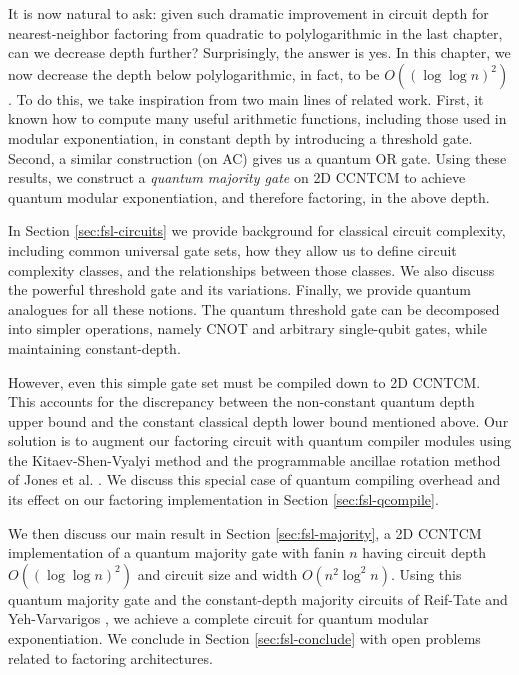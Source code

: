 It is now natural to ask: given such dramatic improvement in circuit depth
for nearest-neighbor factoring
from quadratic \cite{Kutin2006} to polylogarithmic in the last chapter, can we
decrease depth further? Surprisingly, the answer is yes. In this
chapter, we now decrease the depth below polylogarithmic, in fact,
to be $O((\log \log n)^2)$. To do this, we take inspiration from
two main lines of related work. First, it known how to compute
many useful arithmetic functions, including those used in modular
exponentiation, in constant depth by introducing a threshold gate.
Second, a similar construction (on \textsf{AC}) gives us a
quantum OR gate. Using these results,
we construct a \emph{quantum majority gate} on \textsf{2D CCNTCM} to
achieve quantum modular exponentiation, and therefore factoring, in the above
depth.

In Section \ref{sec:fsl-circuits} we provide background for classical circuit complexity,
including common universal gate sets, how they allow us to define circuit
complexity classes, and the relationships between those classes. We also
discuss the powerful threshold gate and its variations. Finally, we provide
quantum analogues for all these notions.
The quantum threshold
gate can be decomposed into simpler operations, namely CNOT and
arbitrary single-qubit gates, while maintaining constant-depth.

However,
even this simple gate set must be compiled down to \textsf{2D CCNTCM}.
This accounts for the discrepancy between the
non-constant quantum depth upper bound and the constant classical
depth lower bound mentioned above. Our solution is to augment our factoring circuit
with quantum compiler modules using the Kitaev-Shen-Vyalyi method \cite{Kitaev2002}
and the programmable ancillae rotation method of Jones et al. \cite{Jones2012}.
We discuss this special case of quantum
compiling overhead and its effect on our factoring implementation in
Section \ref{sec:fsl-qcompile}.

We then discuss our main result in Section \ref{sec:fsl-majority},
a \textsf{2D CCNTCM} implementation
of a quantum majority gate with fanin $n$ having circuit
depth $O((\log \log n)^2)$ and
circuit size and width $O(n^2\log^2 n)$. Using this quantum
majority gate and the constant-depth majority circuits of
Reif-Tate \cite{Reif1992} and Yeh-Varvarigos \cite{Yeh1996},
we achieve a complete circuit for quantum modular exponentiation.
We conclude in Section \ref{sec:fsl-conclude} with open problems
related to factoring architectures.